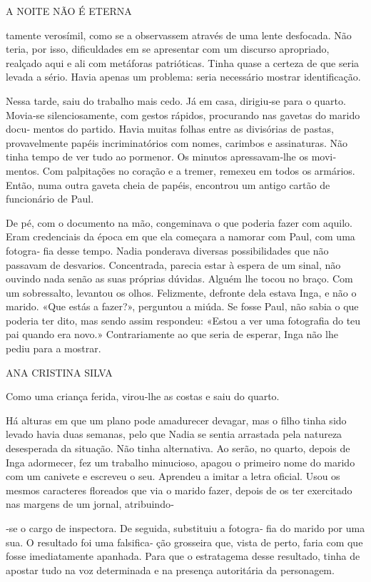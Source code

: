A NOITE NÃO É ETERNA

tamente verosímil, como se a observassem através de uma lente desfocada.
Não teria, por isso, dificuldades em se apresentar com um discurso
apropriado, realçado aqui e ali com metáforas patrióticas. Tinha quase a
certeza de que seria levada a sério. Havia apenas um problema: seria
necessário mostrar identificação.

Nessa tarde, saiu do trabalho mais cedo. Já em casa, dirigiu‑se para o
quarto. Movia‑se silenciosamente, com gestos rápidos, procurando nas
gavetas do marido docu‑ mentos do partido. Havia muitas folhas entre as
divisórias de pastas, provavelmente papéis incriminatórios com nomes,
carimbos e assinaturas. Não tinha tempo de ver tudo ao pormenor. Os
minutos apressavam‑lhe os movi‑ mentos. Com palpitações no coração e a
tremer, remexeu em todos os armários. Então, numa outra gaveta cheia de
papéis, encontrou um antigo cartão de funcionário de Paul.

De pé, com o documento na mão, congeminava o que poderia fazer com
aquilo. Eram credenciais da época em que ela começara a namorar com
Paul, com uma fotogra‑ fia desse tempo. Nadia ponderava diversas
possibilidades que não passavam de desvarios. Concentrada, parecia estar
à espera de um sinal, não ouvindo nada senão as suas próprias dúvidas.
Alguém lhe tocou no braço. Com um sobressalto, levantou os olhos.
Felizmente, defronte dela estava Inga, e não o marido. «Que estás a
fazer?», perguntou a miúda. Se fosse Paul, não sabia o que poderia ter
dito, mas sendo assim respondeu: «Estou a ver uma fotografia do teu pai
quando era novo.» Contrariamente ao que seria de esperar, Inga não lhe
pediu para a mostrar.

ANA CRISTINA SILVA

Como uma criança ferida, virou‑lhe as costas e saiu do quarto.

Há alturas em que um plano pode amadurecer devagar, mas o filho tinha
sido levado havia duas semanas, pelo que Nadia se sentia arrastada pela
natureza desesperada da situação. Não tinha alternativa. Ao serão, no
quarto, depois de Inga adormecer, fez um trabalho minucioso, apagou o
primeiro nome do marido com um canivete e escreveu o seu. Aprendeu a
imitar a letra oficial. Usou os mesmos caracteres floreados que via o
marido fazer, depois de os ter exercitado nas margens de um jornal,
atribuindo‑

‑se o cargo de inspectora. De seguida, substituiu a fotogra‑ fia do
marido por uma sua. O resultado foi uma falsifica‑ ção grosseira que,
vista de perto, faria com que fosse imediatamente apanhada. Para que o
estratagema desse resultado, tinha de apostar tudo na voz determinada e
na presença autoritária da personagem.

